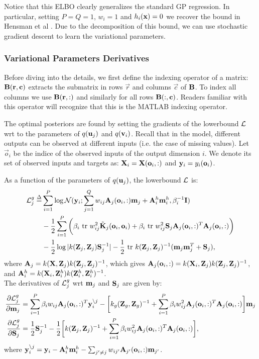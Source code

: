 \documentclass{article} %
\begin{document}
\noindent Notice that this ELBO clearly generalizes the standard GP regression. In particular, setting $P = Q = 1$, $w_i = 1$ and $h_i(\x) = 0$ we recover the bound in Hensman et al \cite{hensmangaussian}.
Due to the decomposition of this bound, we can use stochastic gradient descent to learn the variational parameters.

\subsubsection{Variational Parameters Derivatives}
\newcommand{\oi}{\vec{o}_i}
Before diving into the details, we first define the indexing operator of a matrix: $\B(\vec{r},\vec{c})$ extracts the submatrix in rows $\vec{r}$ and columns $\vec{c}$ of $\B$.
To index all columns we use $\B(\vec{r},:)$ and similarly for all rows $\B(:,\vec{c})$.
Readers familiar with this operator will recognize that this is the MATLAB indexing operator.

The optimal posteriors are found by setting the gradients of the lowerbound $\calL$ wrt to the parameters of $q(\u_j)$ and $q(\v_i)$.
Recall that in the model, different outputs can be observed at different inputs (i.e. the case of missing values).
Let $\oi$ be the indice of the observed inputs of the output dimension $i$.
We denote its set of observed inputs and targets as: $\X_i = \X(\oi,:)$ and $\y_i = y_{i}(\oi)$.

\noindent As a function of the parameters of $q(\u_j)$, the lowerbound $\calL$ is:
\newcommand{\Ahi}{\A^h_i}
\begin{align}
\nonumber
\calL^g_j \define&
 \sum_{i=1}^P \log \Normal(\y_i; \sum_{j=1}^Q w_{ij} \A_j(\oi,:) \m_j + \Ahi \mhi, \beta_i^{-1} \I)  \\
 \nonumber
 &- \frac{1}{2} \sum_{i=1}^P \bigg(\beta_i \trace w_{ij}^2 \tilde{\K}_j(\oi,\oi) 
 + \beta_i \trace w_{ij}^2 \S_j \A_j(\oi,:)^T \A_j(\oi,:) \bigg)
 \\
 &- \frac{1}{2} \log |k(\Zj,\Zj) \S_j^{-1}| -\frac{1}{2} \trace k(\Zj,\Zj)^{-1} (\m_j \m_j^T + \S_j) ,
\end{align}
where $\A_j = k(\X,\Zj)k(\Zj,\Zj)^{-1}$, which gives $\A_j(\oi,:) = k(\X_i,\Zj) k(\Zj,\Zj)^{-1}$, and  
$\Ahi = k(\X_i,\Zhi)k(\Zhi,\Zhi)^{-1}$. \\

\newcommand{\Lgj}{\calL^g_j}
\newcommand{\ynoj}{\y_i^{\backslash j}}
\noindent The derivatives of $\Lgj$ wrt $\m_j$ and $\S_j$ are given by:
\begin{align}
\deriv{\Lgj}{\m_j}
& = \sum_{i=1}^P \beta_i w_{ij} \A_j(\oi,:)^T \ynoj - \bigg[k_g(\Zg,\Zg)^{-1} + \sum_{i=1}^P \beta_i w_{ij}^2 \A_j(\oi,:)^T \A_j(\oi,:) \bigg] \m_j \\
\deriv{\Lgj}{\S_j} 
&= \frac{1}{2} \S_j^{-1} - \frac{1}{2} \bigg[ k(\Zj,\Zj)^{-1} + \sum_{i=1}^P \beta_i w_{ij}^2 \A_j(\oi,:)^T \A_j(\oi,:) \bigg],
\end{align}
where $\y_i^{\backslash j} = \y_i - \Ahi \mhi - \sum_{j' \neq j} w_{ij'} \A_{j'}(\oi,:) \m_{j'}$.
\end{document}
